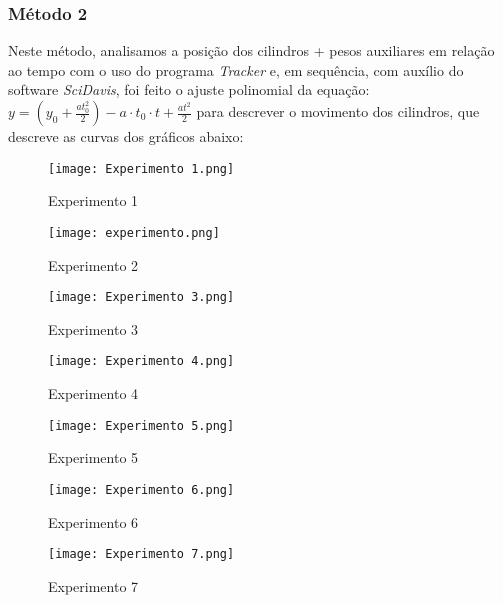 \documentclass[a4papper, 10pt]{article}
\begin{document}
\subsubsection{Método 2}
Neste método, analisamos a posição dos cilindros + pesos auxiliares em relação ao tempo com o uso do programa \textit{Tracker} e, em sequência, com auxílio do software \textit{SciDavis}, foi feito o ajuste polinomial da equação: $y = \left(y_0 + \frac{a t_0^2}{2}\right) - a \cdot t_0 \cdot t + \frac{a t^2}{2}$ 
para descrever o movimento dos cilindros, que descreve as curvas dos gráficos abaixo:
\begin{figure}[H]
    \centering
    \begin{minipage}{0.3\textwidth}
        \centering
        \texttt{[image: Experimento 1.png]}
        \caption{Experimento 1}
    \end{minipage}
    \hfill
    \begin{minipage}{0.3\textwidth}
        \centering
        \texttt{[image: experimento.png]}
        \caption{Experimento 2}
    \end{minipage}
    \hfill
    \begin{minipage}{0.3\textwidth}
        \centering
        \texttt{[image: Experimento 3.png]}
        \caption{Experimento 3}
    \end{minipage}
    \vspace{0.5cm}
    \FloatBarrier
    \begin{minipage}{0.3\textwidth}
        \centering
        \texttt{[image: Experimento 4.png]}
        \caption{Experimento 4}
    \end{minipage}
    \hfill
    \begin{minipage}{0.3\textwidth}
        \centering
        \texttt{[image: Experimento 5.png]}
        \caption{Experimento 5}
    \end{minipage}
    \hfill
    \begin{minipage}{0.3\textwidth}
        \centering
        \texttt{[image: Experimento 6.png]}
        \caption{Experimento 6}
    \end{minipage}
    \vspace{0.5cm}
    \FloatBarrier
    \begin{minipage}{0.3\textwidth}
        \centering
        \texttt{[image: Experimento 7.png]}
        \caption{Experimento 7}
    \end{minipage}
\end{figure}
\\
\end{document}
